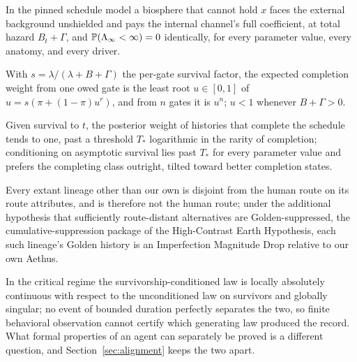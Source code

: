 \begin{proposition}\label{imp:gating}
In the pinned schedule model a biosphere that cannot hold $x$ faces the
external background unshielded and pays the internal channel's full
coefficient, at total hazard $B_t+\Gamma$, and $\mathbb{P}(\Lambda_\infty<\infty)=0$
identically, for every parameter value, every anatomy, and every
driver.
\end{proposition}

\begin{proposition}\label{imp:fixedpoint}
With $s=\lambda/(\lambda+B+\Gamma)$ the per-gate survival factor, the
expected completion weight from one owed gate is the least root
$u\in[0,1]$ of $u=s(\pi+(1-\pi)u^{r})$, and from $n$ gates it is $u^{n}$;
$u<1$ whenever $B+\Gamma>0$.
\end{proposition}

\begin{proposition}\label{imp:threshold}
Given survival to $t$, the posterior weight of histories that complete
the schedule tends to one, past a threshold $T_\ast$ logarithmic in the
rarity of completion; conditioning on asymptotic survival lies past
$T_\ast$ for every parameter value and prefers the completing class
outright, tilted toward better completion states.
\end{proposition}

\begin{lemma}
\label{imp:condimd}
Every extant lineage other than our own is disjoint from the human
route on its route attributes, and is therefore not the human route;
under the additional hypothesis that sufficiently route-distant
alternatives are Golden-suppressed, the cumulative-suppression package
of the High-Contrast Earth Hypothesis, each such lineage's Golden
history is an Imperfection Magnitude Drop relative to our own Aethus.
\end{lemma}

\begin{theorem}\label{imp:ceiling}
In the critical regime the survivorship-conditioned law is locally
absolutely continuous with respect to the unconditioned law on
survivors and globally singular; no event of bounded duration perfectly
separates the two, so finite behavioral observation cannot certify
which generating law produced the record. What formal properties of an
agent can separately be proved is a different question, and
Section~\ref{sec:alignment} keeps the two apart.
\end{theorem}

